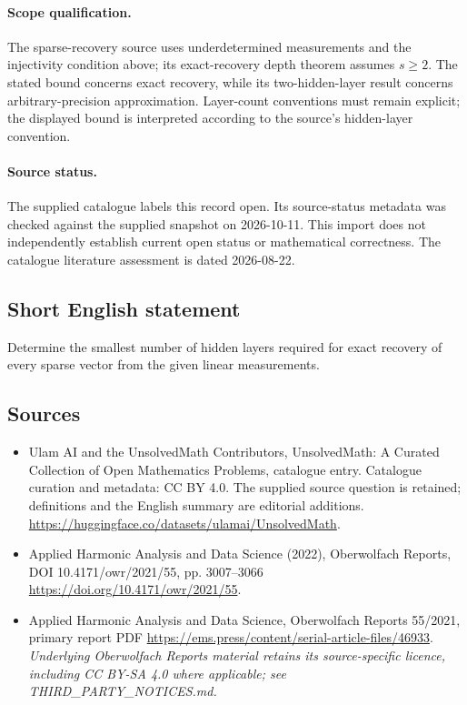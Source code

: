 \documentclass[11pt]{article}
\begin{document}
\paragraph{Scope qualification.}
The sparse-recovery source uses underdetermined measurements and the injectivity condition above; its exact-recovery depth theorem assumes $s\geq2$. The stated bound concerns exact recovery, while its two-hidden-layer result concerns arbitrary-precision approximation. Layer-count conventions must remain explicit; the displayed bound is interpreted according to the source's hidden-layer convention.
\paragraph{Source status.}
The supplied catalogue labels this record open. Its source-status metadata was checked against the supplied snapshot on 2026-10-11. This import does not independently establish current open status or mathematical correctness. The catalogue literature assessment is dated 2026-08-22.
\subsection{Short English statement}
Determine the smallest number of hidden layers required for exact recovery of every sparse vector from the given linear measurements.
\subsection{Sources}
\begin{itemize}
\item[S1] Ulam AI and the UnsolvedMath Contributors, UnsolvedMath: A Curated Collection of Open Mathematics Problems, catalogue entry. Catalogue curation and metadata: CC BY 4.0. The supplied source question is retained; definitions and the English summary are editorial additions.
\url{https://huggingface.co/datasets/ulamai/UnsolvedMath}.
\item[S2] Applied Harmonic Analysis and Data Science (2022), Oberwolfach Reports, DOI 10.4171/owr/2021/55, pp. 3007--3066
\url{https://doi.org/10.4171/owr/2021/55}.
\item[S3] Applied Harmonic Analysis and Data Science, Oberwolfach Reports 55/2021, primary report PDF
\url{https://ems.press/content/serial-article-files/46933}.
\textit{Underlying Oberwolfach Reports material retains its source-specific licence, including CC BY-SA 4.0 where applicable; see THIRD\_PARTY\_NOTICES.md.}
\end{itemize}
\end{document}
